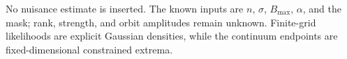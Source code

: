No nuisance estimate is inserted.  The known inputs are \(n\), \(\sigma\), \(B_{\max}\), \(\alpha\), and the mask; rank, strength, and orbit amplitudes remain unknown.  Finite-grid likelihoods are explicit Gaussian densities, while the continuum endpoints are fixed-dimensional constrained extrema.
